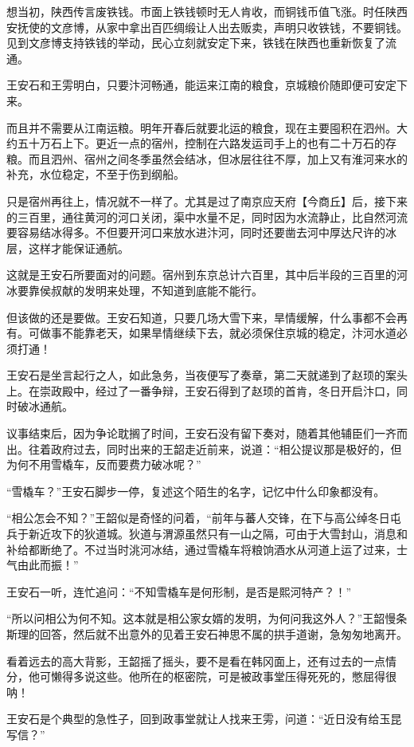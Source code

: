 想当初，陕西传言废铁钱。市面上铁钱顿时无人肯收，而铜钱币值飞涨。时任陕西安抚使的文彦博，从家中拿出百匹绸缎让人出去贩卖，声明只收铁钱，不要铜钱。见到文彦博支持铁钱的举动，民心立刻就安定下来，铁钱在陕西也重新恢复了流通。

王安石和王雱明白，只要汴河畅通，能运来江南的粮食，京城粮价随即便可安定下来。

而且并不需要从江南运粮。明年开春后就要北运的粮食，现在主要囤积在泗州。大约五十万石上下。更近一点的宿州，控制在六路发运司手上的也有二十万石的存粮。而且泗州、宿州之间冬季虽然会结冰，但冰层往往不厚，加上又有淮河来水的补充，水位稳定，不至于伤到纲船。

只是宿州再往上，情况就不一样了。尤其是过了南京应天府【今商丘】后，接下来的三百里，通往黄河的河口关闭，渠中水量不足，同时因为水流静止，比自然河流要容易结冰得多。不但要开河口来放水进汴河，同时还要凿去河中厚达尺许的冰层，这样才能保证通航。

这就是王安石所要面对的问题。宿州到东京总计六百里，其中后半段的三百里的河冰要靠侯叔献的发明来处理，不知道到底能不能行。

但该做的还是要做。王安石知道，只要几场大雪下来，旱情缓解，什么事都不会再有。可做事不能靠老天，如果旱情继续下去，就必须保住京城的稳定，汴河水道必须打通！

王安石是坐言起行之人，如此急务，当夜便写了奏章，第二天就递到了赵顼的案头上。在崇政殿中，经过了一番争辩，王安石得到了赵顼的首肯，冬日开启汴口，同时破冰通航。

议事结束后，因为争论耽搁了时间，王安石没有留下奏对，随着其他辅臣们一齐而出。往着政府过去，同时出来的王韶走近前来，说道：“相公提议那是极好的，但为何不用雪橇车，反而要费力破冰呢？”

“雪橇车？”王安石脚步一停，复述这个陌生的名字，记忆中什么印象都没有。

“相公怎会不知？”王韶似是奇怪的问着，“前年与蕃人交锋，在下与高公绰冬日屯兵于新近攻下的狄道城。狄道与渭源虽然只有一山之隔，可由于大雪封山，消息和补给都断绝了。不过当时洮河冰结，通过雪橇车将粮饷酒水从河道上运了过来，士气由此而振！”

王安石一听，连忙追问：“不知雪橇车是何形制，是否是熙河特产？！”

“所以问相公为何不知。这本就是相公家女婿的发明，为何问我这外人？”王韶慢条斯理的回答，然后就不出意外的见着王安石神思不属的拱手道谢，急匆匆地离开。

看着远去的高大背影，王韶摇了摇头，要不是看在韩冈面上，还有过去的一点情分，他可懒得多说这些。他所在的枢密院，可是被政事堂压得死死的，憋屈得很呐！

王安石是个典型的急性子，回到政事堂就让人找来王雱，问道：“近日没有给玉昆写信？”

